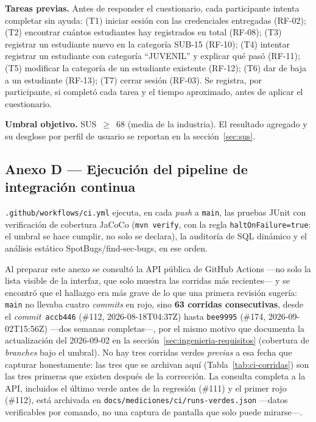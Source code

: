 \documentclass[11pt,a4paper]{article}
\newcommand{\ruta}[1]{\texttt{\footnotesize #1}}
\begin{document}
\textbf{Tareas previas.} Antes de responder el cuestionario, cada
participante intenta completar sin ayuda: (T1) iniciar sesión con las
credenciales entregadas (RF-02); (T2) encontrar cuántos estudiantes
hay registrados en total (RF-08); (T3) registrar un estudiante nuevo
en la categoría SUB-15 (RF-10); (T4) intentar registrar un estudiante
con categoría ``JUVENIL'' y explicar qué pasó (RF-11); (T5) modificar
la categoría de un estudiante existente (RF-12); (T6) dar de baja a un
estudiante (RF-13); (T7) cerrar sesión (RF-03). Se registra, por
participante, si completó cada tarea y el tiempo aproximado, antes de
aplicar el cuestionario.

\textbf{Umbral objetivo.} SUS~$\geq$~68 (media de la industria). El
resultado agregado y su desglose por perfil de usuario se reportan en
la sección~\ref{sec:sus}.

\subsection*{Anexo D --- Ejecución del pipeline de integración continua}

\ruta{.github/workflows/ci.yml} ejecuta, en cada \emph{push} a
\texttt{main}, las pruebas JUnit con verificación de cobertura JaCoCo
(\texttt{mvn verify}, con la regla \texttt{haltOnFailure=true}: el
umbral se hace cumplir, no solo se declara), la auditoría de SQL
dinámico y el análisis estático SpotBugs/find-sec-bugs, en ese orden.

Al preparar este anexo se consultó la API pública de GitHub Actions
—no solo la lista visible de la interfaz, que solo muestra las
corridas más recientes— y se encontró que el hallazgo era más grave de
lo que una primera revisión sugería: \texttt{main} no llevaba cuatro
\emph{commits} en rojo, sino \textbf{63 corridas consecutivas}, desde
el \emph{commit}~\texttt{accb446} (\#112, 2026-08-18T04:37Z) hasta
\texttt{bee9995} (\#174, 2026-09-02T15:56Z) —dos semanas completas—,
por el mismo motivo que documenta la actualización del 2026-09-02 en
la sección~\ref{sec:ingenieria-requisitos} (cobertura de
\emph{branches} bajo el umbral). No hay tres corridas verdes
\emph{previas} a esa fecha que capturar honestamente: las tres que se
archivan aquí (Tabla~\ref{tab:ci-corridas}) son las tres primeras que
existen después de la corrección. La consulta completa a la API,
incluidos el último verde antes de la regresión (\#111) y el primer
rojo (\#112), está archivada en
\ruta{docs/mediciones/ci/runs-verdes.json} —datos verificables por
comando, no una captura de pantalla que solo puede mirarse—.
\end{document}

